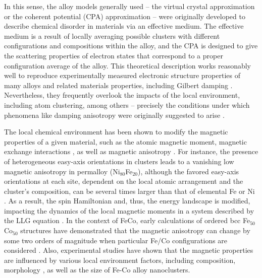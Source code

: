 In this sense, the alloy models generally used -- the virtual crystal approximation \cite{PhysRevB.45.12911} or the coherent potential (CPA) approximation \cite{faulkner1982modern} -- were originally developed to describe chemical disorder in materials \cite{PhysRevLett.52.77} via an effective medium. The effective medium is a result of locally averaging possible clusters with different configurations and compositions within the alloy, and the CPA is designed to give the scattering properties of electron states that correspond to a proper configuration average of the alloy. This theoretical description 
works reasonably well to reproduce experimentally measured electronic structure properties of many alloys \cite{PhysRevLett.93.027203,PhysRevB.36.9657,PhysRevLett.40.900,PhysRevB.66.214206} and related materials properties, including Gilbert damping \cite{PhysRevB.87.014430,PhysRevB.92.214407,PhysRevB.94.214410,PhysRevB.108.014433}. Nevertheless, they frequently overlook the impacts of the local environment, including atom clustering, among others -- precisely the conditions under which phenomena like damping anisotropy were originally suggested to arise \cite{PhysRevLett.122.117203}. 

The local chemical environment has been shown to modify the magnetic properties of a given material, such as the atomic magnetic moment, magnetic exchange interactions \cite{bezerra2013complex, miranda2017dimensionality, de2016first, martins2016magnetic}, as well as  magnetic anisotropy \cite{PhysRevB.97.224402}. For instance, the presence of heterogeneous easy-axis orientations in clusters leads to a vanishing low magnetic anisotropy in permalloy (Ni$_{80}$Fe$_{20}$), although the favored easy-axis orientations at each site, dependent on the local atomic arrangement and the cluster's composition, can be several times larger than that of elemental Fe or Ni \cite{PhysRevB.97.224402}. As a result, the spin Hamiltonian and, thus, the energy landscape is modified, impacting the dynamics of the local magnetic moments in a system described by the LLG equation \cite{PhysRevB.86.224401}. In the context of FeCo, early calculations of ordered bcc Fe$_{50}$Co$_{50}$ structures have demonstrated that the magnetic anisotropy can change by some two orders of magnitude when particular Fe/Co configurations are considered \cite{Razee2001}. Also, experimental studies have shown that the magnetic properties are influenced by various local environment factors, including composition, morphology \cite{hesani2010effect, PhysRevLett.96.257205, karipoth2016magnetic}, as well as the size of Fe-Co alloy nanoclusters. 

